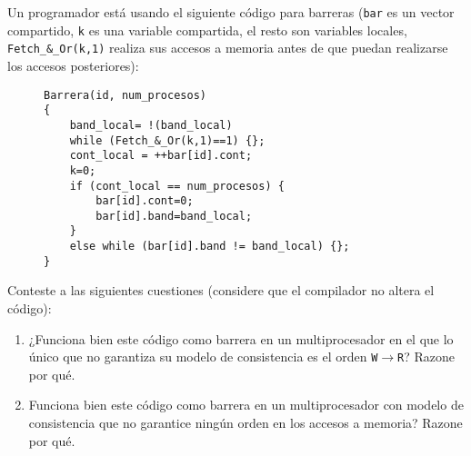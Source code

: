 \begin{ejercicio}
    Un programador está usando el siguiente código para barreras (\verb|bar| es un vector compartido, \verb|k|
    es una variable compartida, el resto son variables locales, \verb|Fetch_&_Or(k,1)| realiza sus accesos a memoria
    antes de que puedan realizarse los accesos posteriores):
    \begin{figure}[H]
        \centering
        \begin{verbatim}
Barrera(id, num_procesos)
{
    band_local= !(band_local)
    while (Fetch_&_Or(k,1)==1) {};
    cont_local = ++bar[id].cont;
    k=0;
    if (cont_local == num_procesos) {
        bar[id].cont=0;
        bar[id].band=band_local;
    }
    else while (bar[id].band != band_local) {};
}
        \end{verbatim}
    \end{figure}
    Conteste a las siguientes cuestiones (considere que el compilador no altera el código):
    \begin{enumerate}
        \item ¿Funciona bien este código como barrera en un multiprocesador en el que lo único que no garantiza su
        modelo de consistencia es el orden \verb|W|$\to$\verb|R|? Razone por qué.
        \item Funciona bien este código como barrera en un multiprocesador con modelo de consistencia que no
        garantice ningún orden en los accesos a memoria? Razone por qué.
    \end{enumerate}
\end{ejercicio}


